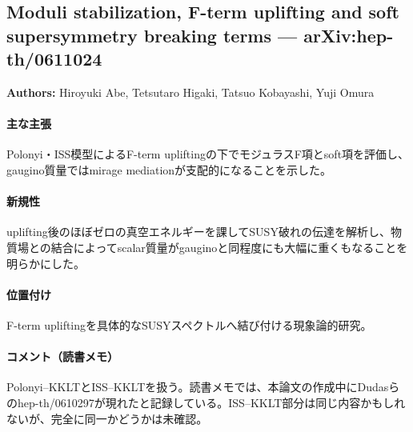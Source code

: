 \subsection{Moduli stabilization, F-term uplifting and soft supersymmetry breaking terms --- arXiv:hep-th/0611024}

\textbf{Authors:} Hiroyuki Abe, Tetsutaro Higaki, Tatsuo Kobayashi, Yuji Omura

\paragraph{主な主張}
Polonyi・ISS模型によるF-term upliftingの下でモジュラスF項とsoft項を評価し、gaugino質量ではmirage mediationが支配的になることを示した\cite{Abe:2006xp}。

\paragraph{新規性}
uplifting後のほぼゼロの真空エネルギーを課してSUSY破れの伝達を解析し、物質場との結合によってscalar質量がgauginoと同程度にも大幅に重くもなることを明らかにした。

\paragraph{位置付け}
F-term upliftingを具体的なSUSYスペクトルへ結び付ける現象論的研究。

\paragraph{コメント（読書メモ）}
Polonyi--KKLTとISS--KKLTを扱う。読書メモでは、本論文の作成中にDudasらのhep-th/0610297\cite{Dudas:2006gr}が現れたと記録している。ISS--KKLT部分は同じ内容かもしれないが、完全に同一かどうかは未確認。
